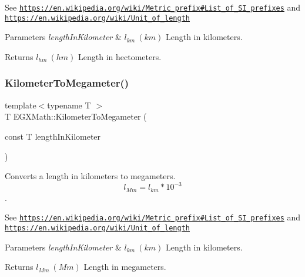 See \href{https://en.wikipedia.org/wiki/Metric_prefix#List_of_SI_prefixes}{\tt https\+://en.\+wikipedia.\+org/wiki/\+Metric\+\_\+prefix\#\+List\+\_\+of\+\_\+\+S\+I\+\_\+prefixes} and \href{https://en.wikipedia.org/wiki/Unit_of_length}{\tt https\+://en.\+wikipedia.\+org/wiki/\+Unit\+\_\+of\+\_\+length} 
\begin{DoxyParams}{Parameters}
{\em length\+In\+Kilometer} & $ l_{km}\ (km)$ Length in kilometers. \\
\hline
\end{DoxyParams}
\begin{DoxyReturn}{Returns}
$ l_{hm}\ (hm)$ Length in hectometers. 
\end{DoxyReturn}
\mbox{\label{group___e_g_x_math-_conversions-_length_conversions-_kilometer-_s_i_gacfeaef9cf345a9907addb7989eb11034}} 
\subsubsection{\texorpdfstring{Kilometer\+To\+Megameter()}{KilometerToMegameter()}}
{\footnotesize\ttfamily template$<$typename T $>$ \\
T E\+G\+X\+Math\+::\+Kilometer\+To\+Megameter (\begin{DoxyParamCaption}\item[{const T}]{length\+In\+Kilometer }\end{DoxyParamCaption})}



Converts a length in kilometers to megameters. \[ l_{Mm}=l_{km} * 10^{-3} \]. 

See \href{https://en.wikipedia.org/wiki/Metric_prefix#List_of_SI_prefixes}{\tt https\+://en.\+wikipedia.\+org/wiki/\+Metric\+\_\+prefix\#\+List\+\_\+of\+\_\+\+S\+I\+\_\+prefixes} and \href{https://en.wikipedia.org/wiki/Unit_of_length}{\tt https\+://en.\+wikipedia.\+org/wiki/\+Unit\+\_\+of\+\_\+length} 
\begin{DoxyParams}{Parameters}
{\em length\+In\+Kilometer} & $ l_{km}\ (km)$ Length in kilometers. \\
\hline
\end{DoxyParams}
\begin{DoxyReturn}{Returns}
$ l_{Mm}\ (Mm)$ Length in megameters. 
\end{DoxyReturn}
\mbox{\label{group___e_g_x_math-_conversions-_length_conversions-_kilometer-_s_i_ga0c3c04124b670e73baa39fb7c9ed5846}} 
